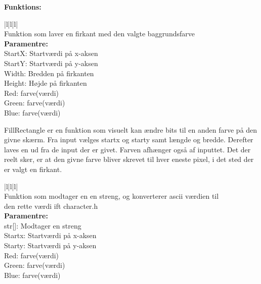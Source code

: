 \textbf{\large Funktions:}

\begin{center}
\begin{tabular}{ |l|l|l| }
\hline
{} \\
\hline
Funktion som laver en firkant med den valgte baggrundsfarve  \\
\hline
\textbf{Paramentre:}  \\ StartX: Startværdi på x-aksen \\StartY: Startværdi på y-aksen\\ Width: Bredden på firkanten\\ Height: Højde på firkanten\\ Red: farve(værdi)\\ Green: farve(værdi) \\ Blue: farve(værdi)\\
\hline
\end{tabular}
\end{center} 

FillRectangle er en funktion som visuelt kan ændre bits til en anden farve på den givne skærm. Fra input vælges startx og starty samt længde og bredde. Derefter laves en ud fra de input der er givet. Farven afhænger også af inputtet. Det der reelt sker, er at den givne farve bliver skrevet til hver eneste pixel, i det sted der er valgt en firkant. 

\begin{center}
\begin{tabular}{ |l|l|l| }
\hline
{} \\
\hline
Funktion som modtager en en streng, og konverterer ascii værdien til \\den rette værdi ift character.h \\
\hline
\textbf{Paramentre:}  \\str[]: Modtager en streng\\  Startx: Startværdi på x-aksen \\Starty: Startværdi på y-aksen\\ Red: farve(værdi)\\ Green: farve(værdi) \\ Blue: farve(værdi)\\
\\

\hline
\end{tabular}
\end{center}  


